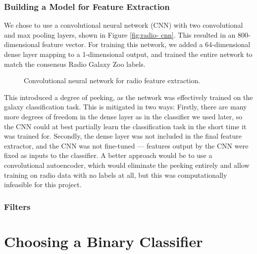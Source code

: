     \subsubsection{Building a Model for Feature Extraction}
    \label{sec:feature-extraction-model}

      We chose to use a convolutional neural network (CNN) with two
      convolutional and max pooling layers, shown in Figure \ref{fig:radio-
      cnn}. This resulted in an 800-dimensional feature vector. For training
      this network, we added a 64-dimensional dense layer mapping to a
      1-dimensional output, and trained the entire network to match the
      consensus Radio Galaxy Zoo labels.

      \begin{figure}[!ht]
         \centering
         
         \caption{Convolutional neural network for radio feature extraction.}
         \label{fig:radio-cnn}
       \end{figure}

       This introduced a degree of peeking, as the network was effectively trained on the galaxy classification task. This is mitigated in two ways: Firstly, there are many more degrees of freedom in the dense layer as in the classifier we used later, so the CNN could at best partially learn the classification task in the short time it was trained for. Secondly, the dense layer was not included in the final feature extractor, and the CNN was not fine-tuned --- features output by the CNN were fixed as inputs to the classifier. A better approach would be to use a convolutional autoencoder, which would eliminate the peeking entirely and allow training on radio data with no labels at all, but this was computationally infeasible for this project.

    \subsubsection{Filters}
    \label{sec:image-filters}

      

\section{Choosing a Binary Classifier}
\label{sec:binary-classifiers}
  
